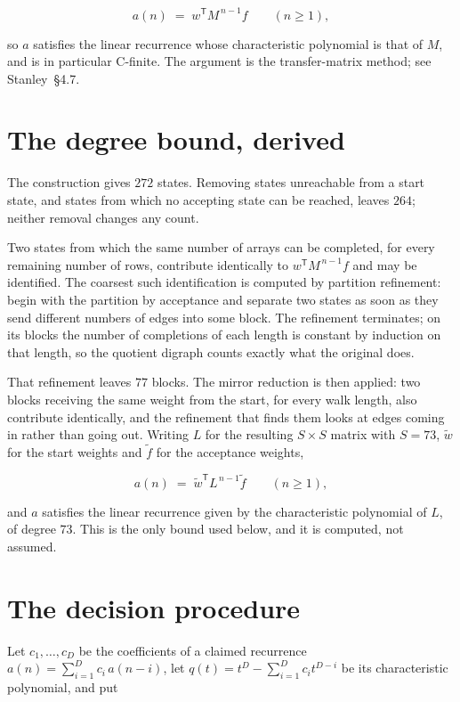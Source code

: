 \documentclass[11pt]{article}
\theoremstyle{definition}
\begin{document}
\[a(n) \;=\; w^{\mathsf T} M^{\,n-1} f \qquad (n \ge 1),\]

so $a$ satisfies the linear recurrence whose characteristic polynomial is that of $M$, and is in particular C-finite. The argument is the transfer-matrix method; see Stanley~\S4.7.

\section{The degree bound, derived}

The construction gives $272$ states. Removing states unreachable from a start state, and states from which no accepting state can be reached, leaves $264$; neither removal changes any count.

Two states from which the same number of arrays can be completed, for every remaining number of rows, contribute identically to $w^{\mathsf T}M^{\,n-1}f$ and may be identified. The coarsest such identification is computed by partition refinement: begin with the partition by acceptance and separate two states as soon as they send different numbers of edges into some block. The refinement terminates; on its blocks the number of completions of each length is constant by induction on that length, so the quotient digraph counts exactly what the original does.

That refinement leaves $77$ blocks. The mirror reduction is then applied: two blocks receiving the same weight from the start, for every walk length, also contribute identically, and the refinement that finds them looks at edges coming in rather than going out. Writing $L$ for the resulting $S \times S$ matrix with $S = 73$, $\tilde w$ for the start weights and $\tilde f$ for the acceptance weights,

\[a(n) \;=\; \tilde w^{\mathsf T} L^{\,n-1} \tilde f \qquad (n \ge 1),\]

and $a$ satisfies the linear recurrence given by the characteristic polynomial of $L$, of degree $73$. This is the only bound used below, and it is computed, not assumed.

\section{The decision procedure}

Let $c_1,\dots,c_D$ be the coefficients of a claimed recurrence $a(n) = \sum_{i=1}^{D} c_i\,a(n-i)$, let $q(t) = t^{D} - \sum_{i=1}^{D} c_i t^{D-i}$ be its characteristic polynomial, and put
\end{document}
